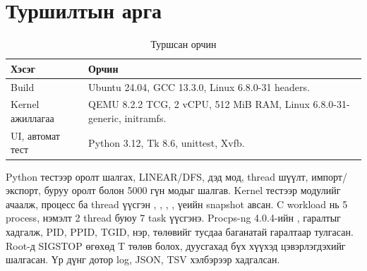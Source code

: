 \section{Туршилтын арга}
\begin{table}[H]
\centering\small
\caption{Туршсан орчин}
\begin{tabularx}{\textwidth}{|P{3.2cm}|Y|}\hline
{}\textbf{Хэсэг} & \textbf{Орчин} \\\hline
Build & Ubuntu 24.04, GCC 13.3.0, Linux 6.8.0-31 headers. \\\hline
Kernel ажиллагаа & QEMU 8.2.2 TCG, 2 vCPU, 512 MiB RAM, Linux 6.8.0-31-generic, initramfs. \\\hline
UI, автомат тест & Python 3.12, Tk 8.6, unittest, Xvfb. \\\hline
\end{tabularx}
\end{table}
Python тестээр оролт шалгах, LINEAR/DFS, дэд мод, thread шүүлт, импорт/экспорт, буруу оролт болон 5000 гүн модыг шалгав. Kernel тестээр модулийг ачаалж, процесс ба thread үүсгэн , , , ,  үеийн snapshot авсан.
C workload нь 5 process, нэмэлт 2 thread буюу 7 task үүсгэнэ. Procps-ng 4.0.4-ийн ,  гаралтыг хадгалж, PID, PPID, TGID, нэр, төлөвийг тусдаа баганатай гаралтаар тулгасан.  Root-д SIGSTOP өгөхөд T төлөв болох, дуусгахад бүх хүүхэд цэвэрлэгдэхийг шалгасан. Үр дүнг  дотор log, JSON, TSV хэлбэрээр хадгалсан.

\clearpage
